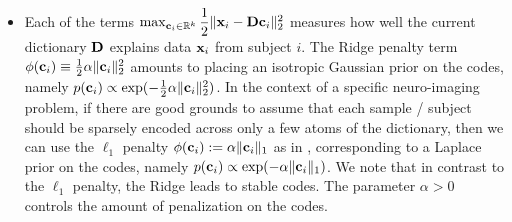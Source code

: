 \begin{itemize}
\item Each of the terms $\max_{\mathbf{c}_i \in \mathbb R^k}\dfrac{1}{2}\|\mathbf{x}_i-\mathbf{D}\mathbf{c}_i\|_2^2$ measures how well the current dictionary $\mathbf{D}$ explains data $\mathbf{x}_i$ from subject $i$.
The Ridge penalty term $\phi(\mathbf{c}_i) \equiv \frac{1}{2}\alpha\|\mathbf{c}_i\|_2^2$
amounts to placing an isotropic Gaussian prior on the codes, namely $p(\mathbf{c}_i) \propto \exp(-\frac{1}{2}\alpha\|\mathbf{c}_i\|_2^2)$. In the context of a specific
neuro-imaging problem, if there are good grounds to assume that each
sample / subject should be sparsely encoded across only a few atoms of
the dictionary, then we can use the $\ell_1$ penalty $\phi(\mathbf{c}_i) :=
\alpha\|\mathbf{c}_i\|_1$ as in   \citep{mairal2010}, corresponding to a Laplace prior on the codes, namely $p(\mathbf{c}_i) \propto \exp(-\alpha\|\mathbf{c}_i\|_1)$. We note that in contrast to
the $\ell_1$ penalty, the Ridge leads to stable codes. The parameter $\alpha > 0$ controls the amount of penalization on the codes. %



\end{itemize}
